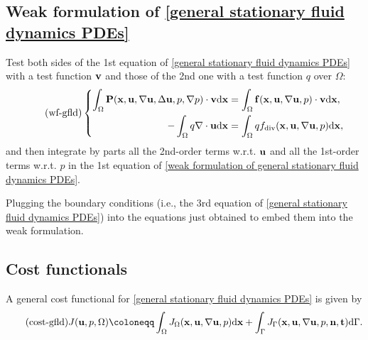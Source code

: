 \documentclass[oneside,11pt]{book}
\numberwithin{equation}{section}
\begin{document}
\subsection{Weak formulation of \eqref{general stationary fluid dynamics PDEs}}
Test both sides of the 1st equation of \eqref{general stationary fluid dynamics PDEs} with a test function ${\bf v}$ and those of the 2nd one with a test function $q$ over $\Omega$:
\begin{equation}
    \label{weak formulation of general stationary fluid dynamics PDEs}
    \tag{wf-gfld}
    \left\{\begin{split}
        \int_\Omega {\bf P}({\bf x},{\bf u},\nabla{\bf u},\Delta{\bf u},p,\nabla p)\cdot{\bf v}{\rm d}{\bf x} &= \int_\Omega {\bf f}({\bf x},{\bf u},\nabla{\bf u},p)\cdot{\bf v}{\rm d}{\bf x},\\
        -\int_\Omega q\nabla\cdot{\bf u}{\rm d}{\bf x} &= \int_\Omega qf_{\rm div}({\bf x},{\bf u},\nabla{\bf u},p){\rm d}{\bf x},
    \end{split}\right.
\end{equation}
and then integrate by parts all the 2nd-order terms w.r.t. ${\bf u}$ and all the 1st-order terms w.r.t. $p$ in the 1st equation of \eqref{weak formulation of general stationary fluid dynamics PDEs}.

Plugging the boundary conditions (i.e., the 3rd equation of \eqref{general stationary fluid dynamics PDEs}) into the equations just obtained to embed them into the weak formulation.

\subsection{Cost functionals}
A general cost functional for \eqref{general stationary fluid dynamics PDEs} is given by
\begin{align}
    \label{cost functional of general stationary fluid dynamics PDEs}
    \tag{cost-gfld}
    J({\bf u},p,\Omega)\coloneqq\int_\Omega J_\Omega({\bf x},{\bf u},\nabla{\bf u},p){\rm d}{\bf x} + \int_\Gamma J_\Gamma({\bf x},{\bf u},\nabla{\bf u},p,{\bf n},{\bf t}){\rm d}\Gamma.
\end{align}
\end{document}
